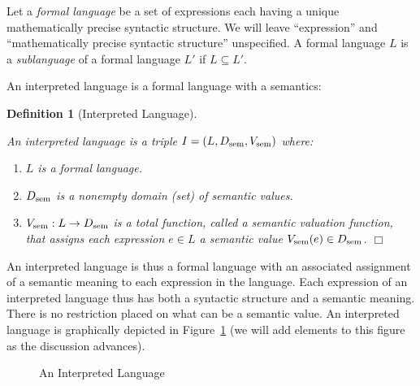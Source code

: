 \documentclass[11pt,fleqn]{article}
\newcommand{\be}{\begin{enumerate}}
\newcommand{\ee}{\end{enumerate}}
\newcommand{\bsp}{\begin{sloppypar}}
\newcommand{\esp}{\end{sloppypar}}
\newcommand{\tarrow}{\rightarrow}
\newtheorem{df}[thm]{Definition}
\begin{document}
Let a \emph{formal language} be a set of expressions each having a
unique mathematically precise syntactic structure.  We will leave
``expression'' and ``mathematically precise syntactic structure''
unspecified.  A formal language $L$ is a \emph{sublanguage} of a
formal language $L'$ if $L \subseteq L'$.

An interpreted language is a formal language with a semantics:

\begin{df}[Interpreted Language] \label{df:interp-lang} \em \bsp
An \emph{interpreted language} is a triple $I=(L,D_{\rm sem},V_{\rm
  sem})$ where: 

\be

  \item $L$ is a formal language.

  \item $D_{\rm sem}$ is a nonempty domain (set) of \emph{semantic
    values}.

  \item $V_{\rm sem} : L \tarrow D_{\rm sem}$ is a total function,
    called a \emph{semantic valuation function}, that assigns each
    expression $e \in L$ a semantic value $V_{\rm sem}(e) \in D_{\rm
      sem}$. \hfill $\Box$

\ee 
\esp
\end{df}
An interpreted language is thus a formal language with an associated
assignment of a semantic meaning to each expression in the language.
Each expression of an interpreted language thus has both a syntactic
structure and a semantic meaning.  There is no restriction placed on
what can be a semantic value.  An interpreted language is graphically
depicted in Figure~\ref{fig:interp-lang} (we will add elements to this
figure as the discussion advances).

\begin{figure}
\center
{}
\caption{An Interpreted Language}  \label{fig:interp-lang}
\end{figure}
\end{document}
